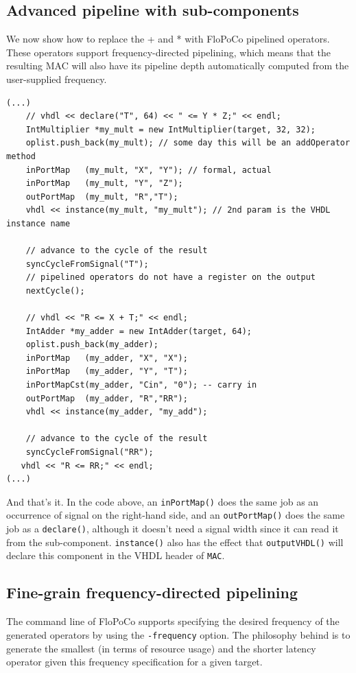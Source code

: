 \documentclass{article}
\begin{document}
\subsection{Advanced pipeline with sub-components}

We now show how to replace the + and * with FloPoCo pipelined
operators. These operators support frequency-directed pipelining,
which means that the resulting MAC will also have its pipeline depth
automatically computed from the user-supplied frequency.

\begin{verbatim}
(...)
	// vhdl << declare("T", 64) << " <= Y * Z;" << endl;
	IntMultiplier *my_mult = new IntMultiplier(target, 32, 32);
	oplist.push_back(my_mult); // some day this will be an addOperator method
	inPortMap   (my_mult, "X", "Y"); // formal, actual
	inPortMap   (my_mult, "Y", "Z");
	outPortMap  (my_mult, "R","T");
	vhdl << instance(my_mult, "my_mult"); // 2nd param is the VHDL instance name

	// advance to the cycle of the result
	syncCycleFromSignal("T"); 
	// pipelined operators do not have a register on the output 
	nextCycle();

	// vhdl << "R <= X + T;" << endl;
	IntAdder *my_adder = new IntAdder(target, 64);
	oplist.push_back(my_adder);
	inPortMap   (my_adder, "X", "X");
	inPortMap   (my_adder, "Y", "T");
	inPortMapCst(my_adder, "Cin", "0"); -- carry in
	outPortMap  (my_adder, "R","RR");
	vhdl << instance(my_adder, "my_add");

	// advance to the cycle of the result
	syncCycleFromSignal("RR"); 
   vhdl << "R <= RR;" << endl; 
(...)
\end{verbatim}


And that's it. In the code above, an \verb!inPortMap()! does the same
job as an occurrence of signal on the right-hand side, and an \verb!outPortMap()! does the same job as
a \verb!declare()!, although it doesn't need a signal width since it
can read it from the sub-component. \verb!instance()! also has the
effect that \verb!outputVHDL()! will declare this component in the
VHDL header of \verb!MAC!.

\subsection{Fine-grain frequency-directed pipelining}
\label{sec:finegrain}

The command line of FloPoCo supports specifying the desired frequency of the
generated operators by using the \verb!-frequency! option. The philosophy behind
is to generate the smallest (in terms of resource usage) and the shorter latency
operator given this frequency specification for a given target.
\end{document}
